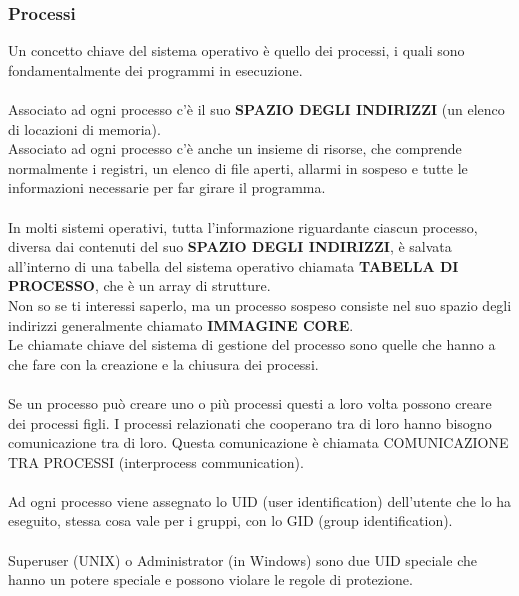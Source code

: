 \documentclass{article}
\begin{document}
\subsubsection{Processi}
Un concetto chiave del sistema operativo è quello dei processi, i quali sono fondamentalmente dei programmi in esecuzione. \\
\\
Associato ad ogni processo c’è il suo \textbf{SPAZIO DEGLI INDIRIZZI }(un elenco di locazioni di memoria).
\\Associato ad ogni processo c’è anche un insieme di risorse, che comprende normalmente i registri, un elenco di file aperti, allarmi in sospeso  e tutte le informazioni necessarie per far girare il programma. 
\\\\In molti sistemi operativi, tutta l’informazione riguardante ciascun processo, diversa dai contenuti del suo \textbf{SPAZIO DEGLI INDIRIZZI}, è salvata all’interno di una tabella del sistema 
operativo chiamata \textbf{TABELLA DI PROCESSO}, che è un array di strutture.
\\Non so se ti interessi saperlo, ma un processo sospeso consiste nel suo spazio degli indirizzi generalmente chiamato \textbf{IMMAGINE CORE}.
\\Le chiamate chiave del sistema di gestione del processo sono quelle che hanno a che fare con la creazione e la chiusura dei processi.
\\\\Se un processo può creare uno o più processi questi a loro volta possono creare dei processi figli. I processi relazionati che cooperano tra di loro hanno bisogno comunicazione tra di loro. Questa comunicazione è chiamata COMUNICAZIONE TRA PROCESSI (interprocess communication).
\\\\Ad ogni processo viene assegnato lo UID (user identification) dell’utente che lo ha eseguito, stessa cosa vale per i gruppi, con lo GID (group identification).
\\\\Superuser (UNIX) o Administrator (in Windows) sono due UID speciale che hanno un potere speciale e possono violare le regole di protezione.
\end{document}
